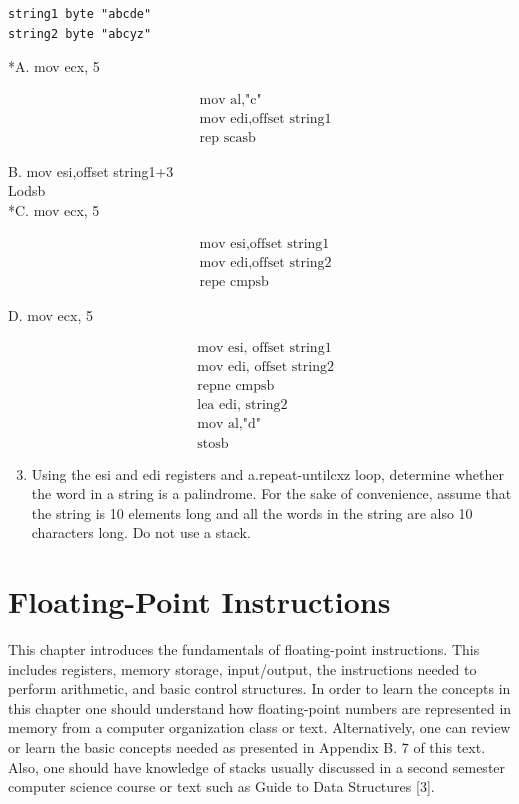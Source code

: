 \documentclass[10pt]{article}
\begin{document}
\begin{verbatim}
string1 byte "abcde"
string2 byte "abcyz"
\end{verbatim}

*A. mov ecx, 5

$$
\begin{aligned}
& \text { mov al,"c" } \\
& \text { mov edi,offset string1 } \\
& \text { rep scasb }
\end{aligned}
$$

B. mov esi,offset string1+3\\
Lodsb\\
*C. mov ecx, 5

$$
\begin{aligned}
& \text { mov esi,offset string1 } \\
& \text { mov edi,offset string2 } \\
& \text { repe cmpsb }
\end{aligned}
$$

D. mov ecx, 5

$$
\begin{aligned}
& \text { mov esi, offset string1 } \\
& \text { mov edi, offset string2 } \\
& \text { repne cmpsb } \\
& \text { lea edi, string2 } \\
& \text { mov al,"d" } \\
& \text { stosb }
\end{aligned}
$$

\begin{enumerate}
  \setcounter{enumi}{2}
  \item Using the esi and edi registers and a.repeat-untilcxz loop, determine whether the word in a string is a palindrome. For the sake of convenience, assume that the string is 10 elements long and all the words in the string are also 10 characters long. Do not use a stack.
\end{enumerate}

\section*{Floating-Point Instructions}
This chapter introduces the fundamentals of floating-point instructions. This includes registers, memory storage, input/output, the instructions needed to perform arithmetic, and basic control structures. In order to learn the concepts in this chapter one should understand how floating-point numbers are represented in memory from a computer organization class or text. Alternatively, one can review or learn the basic concepts needed as presented in Appendix B. 7 of this text. Also, one should have knowledge of stacks usually discussed in a second semester computer science course or text such as Guide to Data Structures [3].
\end{document}
